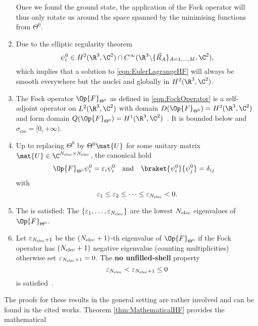 \begin{thm}
\begin{enumerate}[label=(\alph*)]
			Once we found the ground state, the application of the Fock operator
			will thus only rotate us around the space spanned by the minimising
			functions from $\Theta^0$.
		\item Due to the elliptic regularity theorem~\cite{Lieb1977}
			\[ \psi_i^0 \in H^2(\R^3,\C^2) \cap C^\infty(\R^3 \backslash \{\vec{R}_A\}_{A=1,\ldots,M},\C^2), \]
			which implies that a solution to \eqref{eqn:EulerLagrangeHF}
			will always be smooth everywhere but the nuclei and globally in $H^2(\R^3,\C^2)$.
		\item The Fock operator $\Op{F}_{\Theta^0}$ as defined in \eqref{eqn:FockOperator}
			is a self-adjoint operator on $L^2(\R^3,\C^2)$
			with domain $D(\Op{F}_{\Theta^0}) = H^2(\R^3,\C^2)$
			and form domain $Q(\Op{F}_{\Theta^0}) = H^1(\R^3,\C^2)$~\cite{Lions1987}.
			It is bounded below and $\sigma_\text{ess} =[0, +\infty)$.
		\item Up to replacing $\Theta^0$ by $\Theta^0 \mat{U}$
			for some unitary matrix $\mat{U} \in \C^{\Nelec\times\Nelec}$,
			the canonical  hold
			\begin{align}
				\label{eqn:HFequations}
				\Op{F}_{\Theta^0} \psi_i^0 &= \varepsilon_i \psi_i^0
				&&\text{and}&
				\braket{\psi_i^0}{\psi_j^0} &= \delta_{ij}
			\end{align}
			with
			\[ \varepsilon_1 \leq \varepsilon_2 \leq \cdots \leq \varepsilon_{N_\text{elec}} < 0. \]
		\item The  is satisfied:
			The $\{\varepsilon_1, \ldots,\varepsilon_{N_\text{elec}} \}$
			are the lowest $N_\text{elec}$ eigenvalues of $\Op{F}_{\Theta^0}$.
		\item Let $\varepsilon_{N_\text{elec}+1}$ be the $(N_\text{elec}+1)$-th eigenvalue of $\Op{F}_{\Theta^0}$
			if the Fock operator has $(N_\text{elec}+1)$ negative eigenvalue (counting multiplicities)
			otherwise set $\varepsilon_{N_\text{elec}+1} = 0$.
			The \textbf{no unfilled-shell} property
			\[ \varepsilon_{N_\text{elec}} < \varepsilon_{N_\text{elec}+1} \leq 0\]
			is satisfied~\cite{Bach1994}.
	\end{enumerate}
\end{thm}
The proofs for these results in the general setting are rather involved
and can be found in the cited works.
Theorem \ref{thm:MathematicalHF} provides the mathematical

